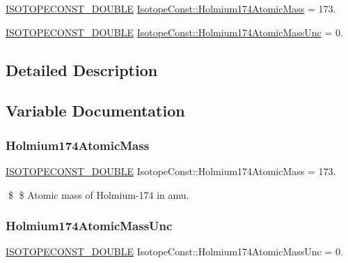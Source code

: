\begin{DoxyCompactItemize}
\item 
\mbox{\hyperlink{group___isotope_const-_macros_ga8f45a7272ce02c0b4c65c44636ed719a}{I\+S\+O\+T\+O\+P\+E\+C\+O\+N\+S\+T\+\_\+\+D\+O\+U\+B\+LE}} \mbox{\hyperlink{group___isotope_const-_holmium-_ho174_gaf05190fe6dbff27b8b434f70c08c364a}{Isotope\+Const\+::\+Holmium174\+Atomic\+Mass}} = 173.
\item 
\mbox{\hyperlink{group___isotope_const-_macros_ga8f45a7272ce02c0b4c65c44636ed719a}{I\+S\+O\+T\+O\+P\+E\+C\+O\+N\+S\+T\+\_\+\+D\+O\+U\+B\+LE}} \mbox{\hyperlink{group___isotope_const-_holmium-_ho174_ga13648e93052af310b9b4fed1593c19c0}{Isotope\+Const\+::\+Holmium174\+Atomic\+Mass\+Unc}} = 0.
\end{DoxyCompactItemize}


\subsection{Detailed Description}


\subsection{Variable Documentation}
\mbox{\label{group___isotope_const-_holmium-_ho174_gaf05190fe6dbff27b8b434f70c08c364a}} 
\subsubsection{\texorpdfstring{Holmium174\+Atomic\+Mass}{Holmium174AtomicMass}}
{\footnotesize\ttfamily \mbox{\hyperlink{group___isotope_const-_macros_ga8f45a7272ce02c0b4c65c44636ed719a}{I\+S\+O\+T\+O\+P\+E\+C\+O\+N\+S\+T\+\_\+\+D\+O\+U\+B\+LE}} Isotope\+Const\+::\+Holmium174\+Atomic\+Mass = 173.}

\$ \$ Atomic mass of Holmium-\/174 in amu. \mbox{\label{group___isotope_const-_holmium-_ho174_ga13648e93052af310b9b4fed1593c19c0}} 
\subsubsection{\texorpdfstring{Holmium174\+Atomic\+Mass\+Unc}{Holmium174AtomicMassUnc}}
{\footnotesize\ttfamily \mbox{\hyperlink{group___isotope_const-_macros_ga8f45a7272ce02c0b4c65c44636ed719a}{I\+S\+O\+T\+O\+P\+E\+C\+O\+N\+S\+T\+\_\+\+D\+O\+U\+B\+LE}} Isotope\+Const\+::\+Holmium174\+Atomic\+Mass\+Unc = 0.}

